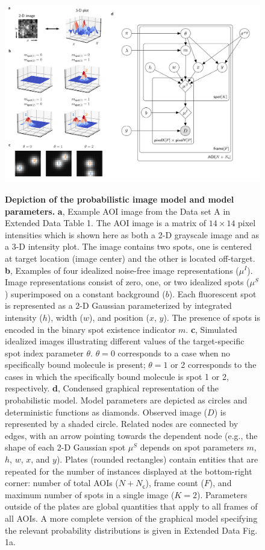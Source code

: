 \begin{figure}[h]
\centering
\includegraphics[width=\textwidth]{figures/figure2.png}
\label{fig:tapqir_model}
\caption{\textbf{Depiction of the probabilistic image model and model parameters.} \textbf{a}, Example AOI image from the Data set A in Extended Data Table 1. The AOI image is a matrix of $14 \times 14$ pixel intensities which is shown here as both a 2-D grayscale image and as a 3-D intensity plot. The image contains two spots, one is centered at target location (image center) and the other is located off-target. \textbf{b}, Examples of four idealized noise-free image representations ($\mu^I$). Image representations consist of zero, one, or two idealized spots ($\mu^S$) superimposed on a constant background ($b$). Each fluorescent spot is represented as a 2-D Gaussian parameterized by integrated intensity ($h$), width ($w$), and position ($x$, $y$). The presence of spots is encoded in the binary spot existence indicator $m$. \textbf{c}, Simulated idealized images illustrating different values of the target-specific spot index parameter $\theta$. $\theta = 0$ corresponds to a case when no specifically bound molecule is present; $\theta = 1$ or 2 corresponds to the cases in which the specifically bound molecule is spot 1 or 2, respectively. \textbf{d}, Condensed graphical representation of the probabilistic model. Model parameters are depicted as circles and deterministic functions as diamonds. Observed image ($D$) is represented by a shaded circle. Related nodes are connected by edges, with an arrow pointing towards the dependent node (e.g., the shape of each 2-D Gaussian spot $\mu^S$ depends on spot parameters $m$, $h$, $w$, $x$, and $y$). Plates (rounded rectangles) contain entities that are repeated for the number of instances displayed at the bottom-right corner: number of total AOIs ($N+N_\mathsf{c}$), frame count ($F$), and maximum number of spots in a single image ($K=2$). Parameters outside of the plates are global quantities that apply to all frames of all AOIs. A more complete version of the graphical model specifying the relevant probability distributions is given in Extended Data Fig. 1a. }
\end{figure}

